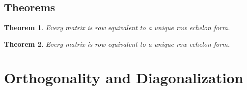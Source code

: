 \documentclass[5pt]{article}
\begin{document}
\begin{multicols}{2}
\subsection{Theorems}
\newtheorem{theorem}{Theorem}
\newtheorem{properties}{Properties}
\begin{theorem}
Every matrix is row equivalent to a unique row echelon form.
\end{theorem}

\begin{theorem}
Every matrix is row equivalent to a unique row echelon form.
\end{theorem}


\section{Orthogonality and Diagonalization}

\end{multicols}
\end{document}
